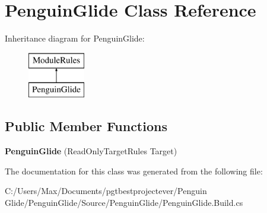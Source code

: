 \hypertarget{class_penguin_glide}{}\section{Penguin\+Glide Class Reference}
\label{class_penguin_glide}
Inheritance diagram for Penguin\+Glide\+:\begin{figure}[H]
\begin{center}
\leavevmode
\includegraphics[height=2.000000cm]{class_penguin_glide}
\end{center}
\end{figure}
\subsection*{Public Member Functions}
\begin{DoxyCompactItemize}
\item 
\mbox{\label{class_penguin_glide_a44f1572327c1e97de8a2cee86e356002}} 
{\bfseries Penguin\+Glide} (Read\+Only\+Target\+Rules Target)
\end{DoxyCompactItemize}


The documentation for this class was generated from the following file\+:\begin{DoxyCompactItemize}
\item 
C\+:/\+Users/\+Max/\+Documents/pgtbestprojectever/\+Penguin Glide/\+Penguin\+Glide/\+Source/\+Penguin\+Glide/Penguin\+Glide.\+Build.\+cs\end{DoxyCompactItemize}
